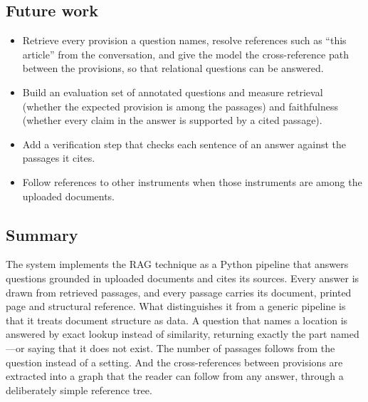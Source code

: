 \subsection{Future work}

\begin{itemize}
  \item Retrieve every provision a question names, resolve references such as
  ``this article'' from the conversation, and give the model the
  cross-reference path between the provisions, so that relational questions
  can be answered.
  \item Build an evaluation set of annotated questions and measure retrieval
  (whether the expected provision is among the passages) and faithfulness
  (whether every claim in the answer is supported by a cited passage).
  \item Add a verification step that checks each sentence of an answer
  against the passages it cites.
  \item Follow references to other instruments when those instruments are
  among the uploaded documents.
\end{itemize}

\subsection{Summary}

The system implements the RAG technique as a Python pipeline that answers
questions grounded in uploaded documents and cites its sources. Every answer
is drawn from retrieved passages, and every passage carries its document,
printed page and structural reference. What distinguishes it from a generic
pipeline is that it treats document structure as data. A question that names
a location is answered by exact lookup instead of similarity, returning exactly
the part named---or saying that it does not exist. The number of passages
follows from the question instead of a setting. And the cross-references
between provisions are extracted into a graph that the reader can follow from
any answer, through a deliberately simple reference tree.
